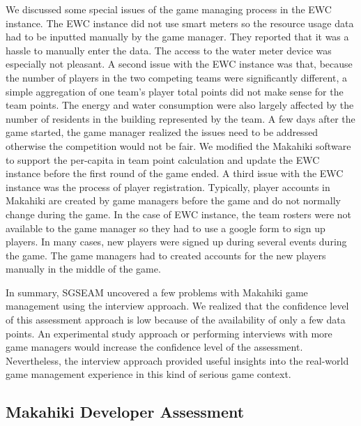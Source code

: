 We discussed some special issues of the game managing process in the EWC instance. The EWC instance did not use smart meters so the resource usage data had to be inputted manually by the game manager. They reported that it was a hassle to manually enter the data. The access to the water meter device was especially not pleasant.  A second issue with the EWC instance was that, because the number of players in the two competing teams were significantly different, a simple aggregation of one team's player total points did not make sense for the team points. The energy and water consumption were also largely affected by the number of residents in the building represented by the team. A few days after the game started, the game manager realized the issues need to be addressed otherwise the competition would not be fair. We modified the Makahiki software to support the per-capita in team point calculation and update the EWC instance before the first round of the game ended. A third issue with the EWC instance was the process of player registration. Typically, player accounts in Makahiki are created by game managers before the game and do not normally change during the game. In the case of EWC instance, the team rosters were not available to the game manager so they had to use a google form to sign up players. In many cases, new players were signed up during several events during the game. The game managers had to created accounts for the new players manually in the middle of the game.

In summary, SGSEAM uncovered a few problems with Makahiki game management using the interview
approach. We realized that the confidence level of this assessment approach is low because of the availability of only a few data points. An experimental study approach or performing interviews with 
more game managers would increase the confidence level of the assessment. Nevertheless, the interview approach provided useful insights into the real-world game management experience in this kind of serious game context.

\subsection{Makahiki Developer Assessment}
\label{sec:developer-in-lab-result} 

